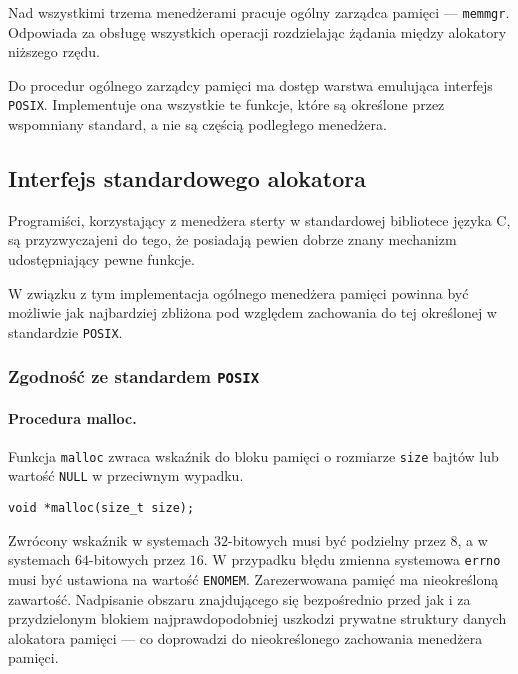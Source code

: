 \documentclass[12pt,a4paper,titlepage,twoside]{mwart}
\begin{document}
Nad wszystkimi trzema menedżerami pracuje ogólny zarządca pamięci ---
\texttt{memmgr}. Odpowiada za obsługę wszystkich operacji rozdzielając
żądania między alokatory niższego rzędu.

Do procedur ogólnego zarządcy pamięci ma dostęp warstwa emulująca interfejs
\texttt{POSIX}. Implementuje ona wszystkie te funkcje, które są określone przez
wspomniany standard, a nie są częścią podległego menedżera.

\newpage

\subsection{Interfejs standardowego alokatora}

\label{PosixMalloc}

Programiści, korzystający z menedżera sterty w standardowej bibliotece języka
C, są przyzwyczajeni do tego, że posiadają pewien dobrze znany mechanizm
udostępniający pewne funkcje.

W związku z tym implementacja ogólnego menedżera pamięci powinna być możliwie
jak najbardziej zbliżona pod względem zachowania do tej określonej w
standardzie \texttt{POSIX}.

\subsubsection{Zgodność ze standardem \texttt{POSIX}}

\paragraph{Procedura malloc.}

Funkcja \texttt{malloc} zwraca wskaźnik do bloku pamięci o rozmiarze
\texttt{size} bajtów lub wartość \texttt{NULL} w przeciwnym wypadku.

\vspace{2ex}
\begin{lstlisting}[caption={Prototyp procedury \texttt{malloc}.}]
void *malloc(size_t size);
\end{lstlisting}

Zwrócony wskaźnik w systemach $32$-bitowych musi być podzielny przez $8$, a w
systemach $64$-bitowych przez $16$. W przypadku błędu zmienna systemowa
\texttt{errno} musi być ustawiona na wartość \texttt{ENOMEM}. Zarezerwowana
pamięć ma nieokreśloną zawartość. Nadpisanie obszaru znajdującego się
bezpośrednio przed jak i za przydzielonym blokiem najprawdopodobniej uszkodzi
prywatne struktury danych alokatora pamięci --- co doprowadzi do nieokreślonego
zachowania menedżera pamięci.
\end{document}
